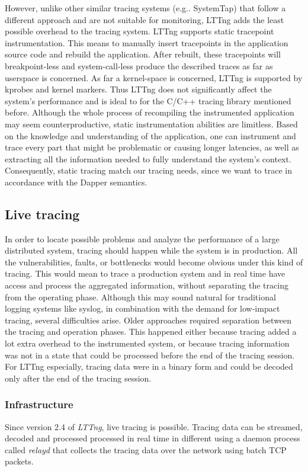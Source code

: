 \documentclass[a4paper,10pt,twocolumn]{article}
\begin{document}
However, unlike other similar tracing systems (e.g.. SystemTap\cite{systemtap})
that follow a different approach and are not suitable for monitoring, LTTng adds
the least possible overhead to the tracing system. LTTng supports static
tracepoint instrumentation. This means to manually insert tracepoints in the
application source code and rebuild the application. After rebuilt, these
tracepoints will breakpoint-less and system-call-less produce the described
traces as far as userspace is concerned. As far a kernel-space is concerned,
LTTng is supported by kprobes and kernel markers. Thus LTTng does not
significantly affect the system's performance and is ideal to for the C/C++
tracing library mentioned before.  Although the whole process of recompiling the
instrumented application  may seem counterproductive, static instrumentation
abilities are limitless. Based on the knowledge and understanding of the
application, one can instrument and trace every part that might be problematic
or causing longer latencies, as well as extracting all the information needed to
fully understand the system's context.  Consequently, static tracing match our
tracing needs, since we want to trace in accordance with the Dapper semantics.

\subsection{Live tracing} In order to locate possible problems and analyze the
performance of a large distributed system, tracing should happen while the
system is in production.  All the vulnerabilities, faults, or bottlenecks would
become obvious under this kind of tracing. This would mean to trace a production
system and in real time have access and process the aggregated information,
without separating the tracing from the operating phase. Although this may sound
natural for traditional logging systems like syslog, in combination with the
demand for low-impact tracing, several difficulties arise. Older approaches
required separation between the tracing and operation phases. This happened
either because tracing added a lot extra overhead to the instrumented system, or
because tracing information was not in a state that could be processed before
the end of the tracing session. For LTTng especially, tracing data were in a
binary form and could be decoded only after the end of the tracing session. 

\subsubsection{Infrastructure} Since version 2.4 of \emph{LTTng}, live tracing
is possible. Tracing data can be streamed, decoded and processed processed in
real time in different using a daemon process called \emph{relayd} that collects
the tracing data over the network using batch TCP packets.  
\end{document}
